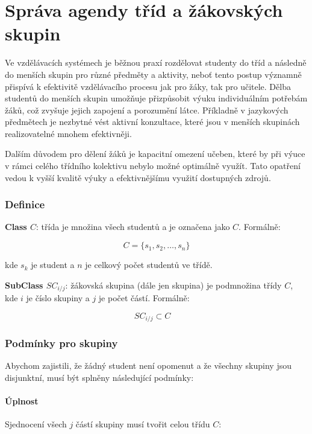 \chapter{Správa agendy tříd a žákovských skupin}

Ve vzdělávacích systémech je běžnou praxí rozdělovat studenty do tříd a následně do menších skupin pro různé předměty a aktivity, neboť tento postup významně přispívá k efektivitě vzdělávacího procesu jak pro žáky, tak pro učitele. Dělba studentů do menších skupin umožňuje přizpůsobit výuku individuálním potřebám žáků, což zvyšuje jejich zapojení a porozumění látce. Příkladně v jazykových předmětech je nezbytné vést aktivní konzultace, které jsou v menších skupinách realizovatelné mnohem efektivněji. 

Dalším důvodem pro dělení žáků je kapacitní omezení učeben, které by při výuce v rámci celého třídního kolektivu nebylo možné optimálně využít. Tato opatření vedou k vyšší kvalitě výuky a efektivnějšímu využití dostupných zdrojů.

\subsection*{Definice}

\textbf{Class \( C \)}: třída je množina všech studentů a je označena jako \( C \). Formálně:

\[
C = \{ s_1, s_2, \ldots, s_n \}
\]

kde \( s_k \) je student a \( n \) je celkový počet studentů ve třídě.

\textbf{SubClass \( SC_{i/j} \)}: žákovská skupina (dále jen skupina) je podmnožina třídy \( C \), kde \( i \) je číslo skupiny a \( j \) je počet částí. Formálně:

\[
SC_{i/j} \subset C \quad
\]

\subsection*{Podmínky pro skupiny}

Abychom zajistili, že žádný student není opomenut a že všechny skupiny jsou disjunktní, musí být splněny následující podmínky:

\subsubsection*{Úplnost}

Sjednocení všech \( j \) částí skupiny musí tvořit celou třídu \( C \):

